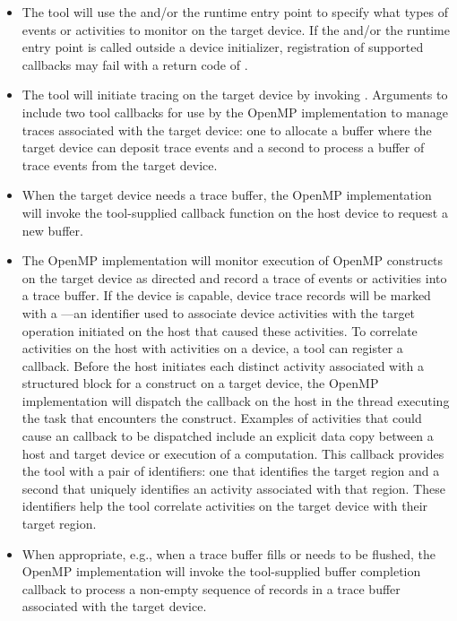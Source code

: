 \begin{itemize}
\item The tool will use the 
  and/or the  runtime entry point to specify what
  types of events or activities to monitor on the target device.
  If the  and/or the 
   runtime entry point is called outside a device
  initializer, registration of supported callbacks may fail with a return code of 
  .
\item The tool will initiate tracing on the target device by 
  invoking . Arguments to 
  include two tool callbacks for use by the OpenMP implementation to manage
  traces associated with the target device: one to allocate
  a buffer where the target device can deposit trace events and a
  second to process a buffer of trace events from the target device. 
\item When the target device needs a trace buffer, the OpenMP implementation 
  will invoke the tool-supplied callback function on the host device to request a new buffer.
\item The OpenMP implementation will monitor execution of OpenMP constructs on the target device as
  directed and record a trace of events or activities into a trace
  buffer. If the device is capable, device trace records will be
  marked with a ---an identifier used to associate
  device activities with the target operation initiated on the host
  that caused these activities.  To correlate activities on the host
  with activities on a device, a tool can register a
   callback. 
  Before the host initiates each distinct activity associated with a structured block for a  construct
  on a target device, the OpenMP implementation will dispatch the  callback
  on the host in the thread executing the task that encounters the  construct. 
  Examples of activities that could cause an  callback to be dispatched
  include an explicit data copy between a host and target device or execution of a computation.
  This callback provides the tool with a pair of identifiers: one that identifies the target region and a second
  that uniquely identifies an activity associated with that region.  
  These identifiers help the tool correlate activities on the target device with their target region.
\item When appropriate, e.g., when a trace buffer fills or needs to be
  flushed, the OpenMP implementation will invoke the tool-supplied buffer
  completion callback to process a non-empty sequence of
  records in a trace buffer associated with the target device.


\end{itemize}
